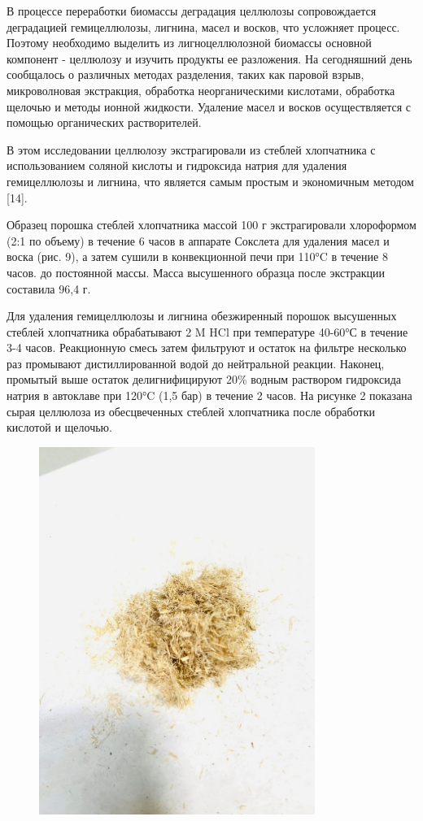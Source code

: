 В процессе переработки биомассы деградация целлюлозы сопровождается
деградацией гемицеллюлозы, лигнина, масел и восков, что усложняет
процесс. Поэтому необходимо выделить из лигноцеллюлозной биомассы
основной компонент - целлюлозу и изучить продукты ее разложения. На
сегодняшний день сообщалось о различных методах разделения, таких как
паровой взрыв, микроволновая экстракция, обработка неорганическими
кислотами, обработка щелочью и методы ионной жидкости. Удаление масел и
восков осуществляется с помощью органических растворителей.

В этом исследовании целлюлозу экстрагировали из стеблей хлопчатника с
использованием соляной кислоты и гидроксида натрия для удаления
гемицеллюлозы и лигнина, что является самым простым и экономичным
методом {[}14{]}.

Образец порошка стеблей хлопчатника массой 100 г экстрагировали
хлороформом (2:1 по объему) в течение 6 часов в аппарате Сокслета для
удаления масел и воска (рис. 9), а затем сушили в конвекционной печи при
110°C в течение 8 часов. до постоянной массы. Масса высушенного образца
после экстракции составила 96,4 г.

Для удаления гемицеллюлозы и лигнина обезжиренный порошок высушенных
стеблей хлопчатника обрабатывают 2 M HCl при температуре 40-60°С в
течение 3-4 часов. Реакционную смесь затем фильтруют и остаток на
фильтре несколько раз промывают дистиллированной водой до нейтральной
реакции. Наконец, промытый выше остаток делигнифицируют 20\% водным
раствором гидроксида натрия в автоклаве при 120°C (1,5 бар) в течение 2
часов. На рисунке 2 показана сырая целлюлоза из обесцвеченных стеблей
хлопчатника после обработки кислотой и щелочью.

\begin{figure}[H]
	\centering
	\includegraphics[width=0.8\textwidth]{assets/77}
	\caption*{}
\end{figure}


